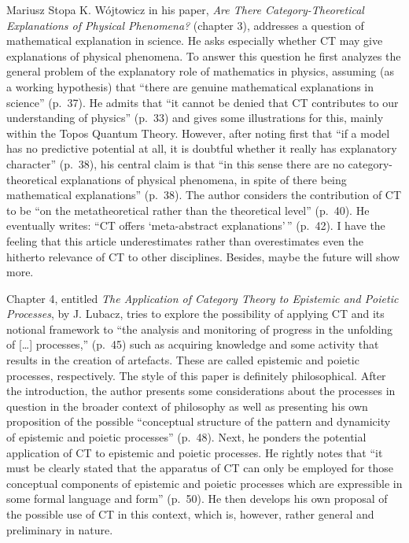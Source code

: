 \begin{recengenv}{Mariusz Stopa}
K. Wójtowicz in his paper, \textit{Are There Category-Theoretical Explanations of Physical Phenomena?} (chapter 3), addresses a question of mathematical explanation in science. He asks especially whether CT may give explanations of physical phenomena. To answer this question he first analyzes the general problem of the explanatory role of mathematics in physics, assuming (as a working hypothesis) that ``there are genuine mathematical explanations in science'' (p.~37). He admits that ``it cannot be denied that CT contributes to our understanding of physics'' (p.~33) and gives some illustrations for this, mainly within the Topos Quantum Theory. However, after noting first that ``if a model has no predictive potential at all, it is doubtful whether it really has explanatory character'' (p.~38), his central claim is that ``in this sense there are no cat\-e\-go\-ry-theoretical explanations of physical phenomena, in spite of there being mathematical explanations'' (p.~38). The author considers the contribution of CT to be ``on the metatheoretical rather than the theoretical level'' (p.~40). He eventually writes: ``CT offers `meta-abstract explanations'$\,\!$'' (p.~42). I have the feeling that this article underestimates rather than overestimates even the hitherto relevance of CT to other disciplines. Besides, maybe the future will show more.


Chapter 4, entitled \textit{The Application of Category Theory to Epistemic and Poietic Processes}, by J. Lubacz, tries to explore the possibility of applying CT and its notional framework to ``the analysis and monitoring of progress in the unfolding of [\ldots] processes,'' (p.~45) such as acquiring knowledge and some activity that results
in the creation of artefacts. These are called epistemic and poietic processes, respectively. The style of this paper is definitely philosophical. After the introduction, the author presents some considerations about the processes in question in the broader context of philosophy as well as presenting his own proposition of the possible ``conceptual structure of the pattern and dynamicity of epistemic and poietic processes'' (p.~48). Next, he ponders the potential application of CT to epistemic and poietic processes. He rightly notes that ``it must be clearly stated that the apparatus of CT can only be employed for those conceptual components of epistemic and poietic processes which are expressible in some formal language and form'' (p.~50). He then develops his own proposal of the possible use of CT in this context, which is, however, rather general and preliminary in nature.


\end{recengenv}
